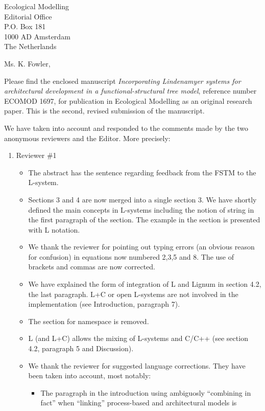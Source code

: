 \documentclass{letter}
\begin{document}
\begin{letter}{ Ecological Modelling \\ Editorial Office \\
               P.O. Box 181 \\ 1000 AD Amsterdam \\ The Netherlands} 
\opening{Ms. K. Fowler,}

Please find the  enclosed manuscript \textsl{Incorporating Lindenamyer
  systems     for     \mbox{architectural}     development    in     a
  functional-structural tree model}, reference number ECOMOD 1697, for
publication  in Ecological  Modelling as  an original  research paper.
This is the second, revised \mbox{submission} of the manuscript.

We have taken  into account and responded to the  comments made by the
two anonymous reviewers and the Editor. More precisely:
\begin{enumerate}
\item  Reviewer \#1
\begin{itemize}
\item The abstract  has the sentence regarding feedback  from the FSTM
  to the L-system.
\item Sections 3 and 4 are now merged into a single section 3. We have
  shortly defined the main  concepts in L-systems including the notion
  of string in the first paragraph  of the section. The example in the
  section is presented with L notation.
\item We thank the reviewer for pointing out typing errors (an obvious
  reason for  confusion) in equations  now numbered 2,3,5 and  8.  The
  use of brackets and commas are now corrected. 
\item We  have explained the  form of integration  of L and  Lignum in
  section  4.2, the  last paragraph.  L+C  or open  L-systems are  not
  involved in the implementation (see Introduction, paragraph 7).
\item The section for namespace is removed.
\item  L (and  L+C)  allows the  mixing  of L-systems  and C/C++  (see
  section 4.2, paragraph 5 and Discussion).
\item We  thank the reviewer for suggested  language corrections. They
  have been taken into account, most notably: 
\begin{itemize}
\item The paragraph in  the introduction using ambiguosly ``combining
  in fact'' when ``linking'' process-based and architectural models is

\end{itemize}
\end{itemize}
\end{enumerate}
\end{letter}
\end{document}
